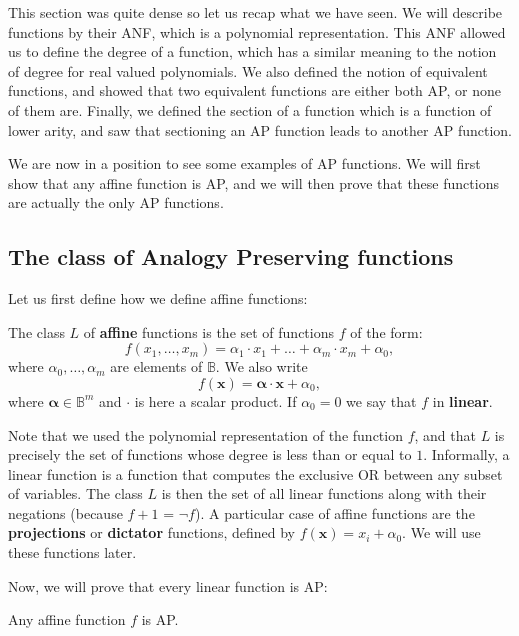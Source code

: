 This section was quite dense so let us recap what we have seen. We will
describe functions by their ANF, which is a polynomial representation. This ANF
allowed us to define the degree of a function, which has a similar meaning to
the notion of degree for real valued polynomials. We also defined the notion of
equivalent functions, and showed that two equivalent functions are either both
AP, or none of them are. Finally, we defined the section of a function which is
a function of lower arity, and saw that sectioning an AP function leads to
another AP function.

We are now in a position to see some examples of AP functions. We will first
show that any affine function is AP, and we will then prove that these
functions are actually the only AP functions.

\subsection{The class of Analogy Preserving functions}

Let us first define how we define affine functions:
\begin{definition}
  The class $L$ of \textbf{affine} functions is the set of functions $f$ of the
  form:
  $$f(x_1,\ldots , x_m)=\alpha_1\cdot x_1+\ldots +\alpha_m\cdot
  x_m+\alpha_0,$$
  where $\alpha_0,\ldots, \alpha_m$ are elements of $\mathbb{B}$. We also write
  $$f(\mathbf{x}) = \boldsymbol{\alpha} \cdot \mathbf{x} + \alpha_0,$$
  where $\boldsymbol{\alpha} \in \mathbb{B}^m$ and $\cdot$ is here a scalar
  product.  If $\alpha_0= 0$ we say that $f$ in \textbf{linear}.
\end{definition}

Note that we used the polynomial representation of the function $f$, and that
$L$ is precisely the set of functions whose degree is less than or equal to
$1$. Informally, a linear function is a function that computes the exclusive OR
between any subset of variables. The class $L$ is then the set of all linear
functions along with their negations (because $f + 1$ = $\neg f$). A particular
case of affine functions are the \textbf{projections} or \textbf{dictator}
functions, defined by $f(\mathbf{x}) = x_i + \alpha_0$. We will use these
functions later.

Now, we will prove that every linear function is AP:
\begin{proposition}
  \label{PROPOS:affine_functions_are_ap}
  Any affine function $f$ is AP.
\end{proposition}

